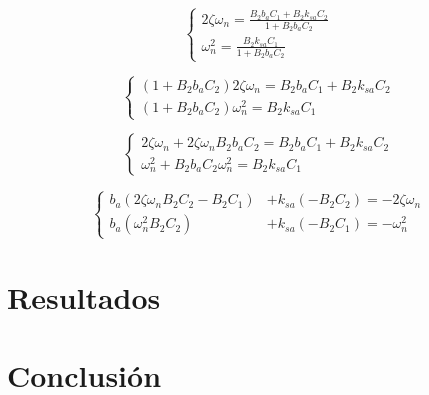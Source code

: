 \documentclass{article}
\begin{document}
            \begin{equation}
                \begin{cases}
                    2\zeta\omega_n = \frac{B_{2}b_a C_1 +B_{2}k_{sa} C_2 }{1+B_{2}b_a C_2} \\
                    \omega_n^2 = \frac{B_{2}k_{sa} C_1}{1+B_{2}b_a C_2}
                \end{cases}
            \end{equation}

            \begin{equation}
                \begin{cases}
                    (1+B_{2}b_a C_2)2\zeta\omega_n = B_{2}b_a C_1 +B_{2}k_{sa} C_2\\
                    (1+B_{2}b_a C_2)\omega_n^2 = B_{2}k_{sa} C_1
                \end{cases}
            \end{equation}

            \begin{equation}
                \begin{cases}
                    2\zeta\omega_n+ 2\zeta\omega_n B_{2}b_a C_2 = B_{2}b_a C_1 +B_{2}k_{sa} C_2\\
                    \omega_n^2+B_{2}b_a C_2\omega_n^2= B_{2}k_{sa} C_1
                \end{cases}
            \end{equation}

            \begin{equation}
                \begin{cases}
                    b_a(2\zeta\omega_n B_{2}C_2-B_{2}C_1) &+ k_{sa}(-B_{2}C_2) = -2\zeta\omega_n \\
                    b_a(\omega_n^2B_{2}C_2) &+ k_{sa}(-B_{2}C_1) = -\omega_n^2
                \end{cases}
            \end{equation}

            




                    

                




\section{Resultados}\label{sec:results}

\section{Conclusión}\label{sec:conclusion}


%

%
\end{document}
